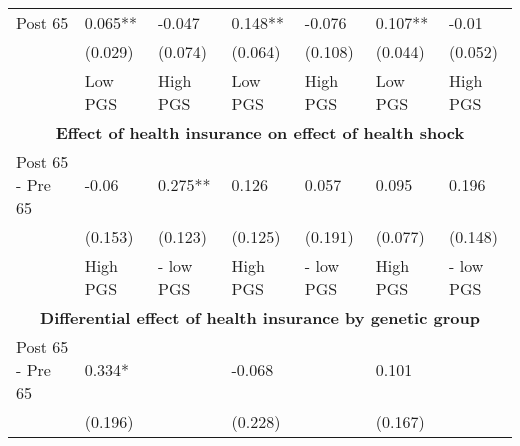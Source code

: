 \begin{tabular}{l| p{2cm}p{2cm}| p{2cm}p{2cm}| p{2cm}p{2cm}}
  Post 65 & 0.065** & -0.047 & 0.148** & -0.076 & 0.107** & -0.01 \\ 
   & (0.029) & (0.074) & (0.064) & (0.108) & (0.044) & (0.052) \\ 
   & Low PGS & High PGS & Low PGS & High PGS & Low PGS & High PGS \\ 
   \toprule \multicolumn{7}{c}{ \textbf{Effect of health insurance on effect of health shock}} \\
 \midrule
Post 65 - Pre 65 & -0.06 & 0.275** & 0.126 & 0.057 & 0.095 & 0.196 \\ 
   \midrule
 & (0.153) & (0.123) & (0.125) & (0.191) & (0.077) & (0.148) \\ 
   & High PGS  & - low PGS & High PGS  & - low PGS & High PGS  & - low PGS \\ 
   \toprule \multicolumn{7}{c}{ \textbf{Differential effect of health insurance by genetic group}} \\
 \midrule
Post 65 - Pre 65 & 0.334* &  & -0.068 &  & 0.101 &  \\ 
   \midrule
 & (0.196) &  & (0.228) &  & (0.167) &  \\ 
  \end{tabular}
